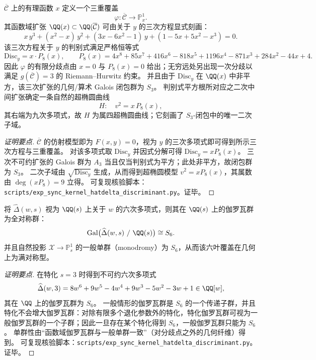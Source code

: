 \begin{proposition}\label{prop:sync-hatdelta-quotient-triple-cover-s3-discriminant}
\(\overline{\mathcal{C}}\) 上的有理函数 \(x\) 定义一个三重覆盖
\[
\varphi:\overline{\mathcal{C}}\longrightarrow\mathbb{P}^1_x.
\]
其函数域扩张 \(\QQ(x)\subset\QQ(\overline{\mathcal{C}})\) 可由关于 \(y\) 的三次方程显式刻画：
\[
x\,y^3+(x^2-x)\,y^2+(3x-6x^2-1)\,y+(1-5x+5x^2-x^3)=0.
\]
该三次方程关于 \(y\) 的判别式满足严格恒等式
\[
\mathrm{Disc}_y=x\cdot P_8(x),
\qquad
P_8(x)=4x^8+85x^7+416x^6-818x^5+1196x^4-871x^3+284x^2-44x+4.
\]
因此 \(\varphi\) 的有限分歧点由 \(x=0\) 与 \(P_8(x)=0\) 给出；无穷远处另出现一次分歧以满足 \(g(\overline{\mathcal{C}})=3\) 的 Riemann--Hurwitz 约束。
并且由于 \(\mathrm{Disc}_y\) 在 \(\QQ(x)\) 中非平方，该三次扩张的几何/算术 Galois 闭包群为 \(S_3\)。
判别式平方根所对应之二次中间扩张确定一条自然的超椭圆曲线
\[
H:\quad v^2=x\,P_8(x),
\]
其右端为九次多项式，故 \(H\) 为属四超椭圆曲线；它刻画了 \(S_3\)-闭包中的唯一二次子域。
\end{proposition}
\begin{proof}[证明要点]
\(\overline{\mathcal{C}}\) 的仿射模型即为 \(F(x,y)=0\)，视为 \(y\) 的三次多项式即可得到所示三次方程与三重覆盖。
对该多项式取 \(\mathrm{Disc}_y\) 并因式分解可得 \(\mathrm{Disc}_y=xP_8(x)\)。
三次不可约扩张的 Galois 群为 \(A_3\) 当且仅当判别式为平方；此处非平方，故闭包群为 \(S_3\)。
二次子域由 \(\sqrt{\mathrm{Disc}_y}\) 生成，从而得到超椭圆模型 \(v^2=xP_8(x)\)，其属数由 \(\deg(xP_8)=9\) 立得。
可复现核验脚本：\texttt{scripts/exp\_sync\_kernel\_hatdelta\_discriminant.py}。证毕。
\end{proof}

\begin{proposition}\label{prop:sync-hatdelta-galois-s6-generic}
将 \(\widehat\Delta(w,s)\) 视为 \(\QQ(s)\) 上关于 \(w\) 的六次多项式，则其在 \(\QQ(s)\) 上的伽罗瓦群为全对称群：
\[
\mathrm{Gal}\bigl(\widehat\Delta(w,s)\ /\ \QQ(s)\bigr)\cong S_6.
\]
并且自然投影 \(\mathcal{X}\to\mathbb{P}^1_s\) 的一般单群（monodromy）为 \(S_6\)，从而该六叶覆盖在几何上为满对称型。
\end{proposition}
\begin{proof}[证明要点]
在特化 \(s=3\) 时得到不可约六次多项式
\[
\widehat\Delta(w,3)=8w^6+9w^5-4w^4+9w^3-5w^2-3w+1\in\QQ[w],
\]
其在 \(\QQ\) 上的伽罗瓦群为 \(S_6\)。
一般情形的伽罗瓦群是 \(S_6\) 的一个传递子群，并且特化不会增大伽罗瓦群：对除有限多个退化参数外的特化，特化伽罗瓦群可视为一般伽罗瓦群的一个子群；因此一旦存在某个特化得到 \(S_6\)，一般伽罗瓦群只能为 \(S_6\)。
单群性由“函数域伽罗瓦群与一般单群一致”（对分歧点之外的几何纤维）得到。
可复现核验脚本：\texttt{scripts/exp\_sync\_kernel\_hatdelta\_discriminant.py}。证毕。
\end{proof}

